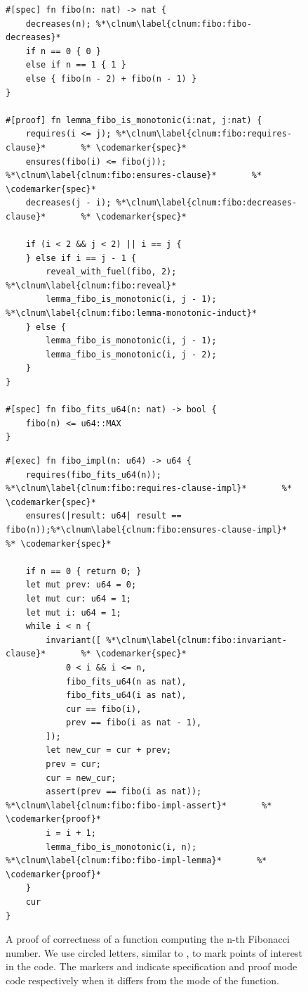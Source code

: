 \begin{figure}

\noindent\begin{minipage}{.5\textwidth}

\begin{lstlisting}[language=Verus,style=VerusLineNos]
#[spec] fn fibo(n: nat) -> nat {
    decreases(n); %*\clnum\label{clnum:fibo:fibo-decreases}*
    if n == 0 { 0 }
    else if n == 1 { 1 }
    else { fibo(n - 2) + fibo(n - 1) }
}

#[proof] fn lemma_fibo_is_monotonic(i:nat, j:nat) { 
    requires(i <= j); %*\clnum\label{clnum:fibo:requires-clause}*       %* \codemarker{spec}*
    ensures(fibo(i) <= fibo(j)); %*\clnum\label{clnum:fibo:ensures-clause}*       %* \codemarker{spec}*
    decreases(j - i); %*\clnum\label{clnum:fibo:decreases-clause}*       %* \codemarker{spec}*

    if (i < 2 && j < 2) || i == j {
    } else if i == j - 1 {
        reveal_with_fuel(fibo, 2); %*\clnum\label{clnum:fibo:reveal}*
        lemma_fibo_is_monotonic(i, j - 1); %*\clnum\label{clnum:fibo:lemma-monotonic-induct}*
    } else {
        lemma_fibo_is_monotonic(i, j - 1);
        lemma_fibo_is_monotonic(i, j - 2);
    }
}

#[spec] fn fibo_fits_u64(n: nat) -> bool {
    fibo(n) <= u64::MAX
} 
\end{lstlisting}
\end{minipage}\hfill
\noindent\begin{minipage}{.5\textwidth}

\begin{lstlisting}[language=Verus,style=VerusLineNos,firstnumber=26]
#[exec] fn fibo_impl(n: u64) -> u64 {
    requires(fibo_fits_u64(n)); %*\clnum\label{clnum:fibo:requires-clause-impl}*       %* \codemarker{spec}* 
    ensures(|result: u64| result == fibo(n));%*\clnum\label{clnum:fibo:ensures-clause-impl}*       %* \codemarker{spec}* 

    if n == 0 { return 0; } 
    let mut prev: u64 = 0;
    let mut cur: u64 = 1;
    let mut i: u64 = 1;
    while i < n {
        invariant([ %*\clnum\label{clnum:fibo:invariant-clause}*       %* \codemarker{spec}* 
            0 < i && i <= n,
            fibo_fits_u64(n as nat),
            fibo_fits_u64(i as nat),
            cur == fibo(i),
            prev == fibo(i as nat - 1),
        ]);
        let new_cur = cur + prev;
        prev = cur;
        cur = new_cur;
        assert(prev == fibo(i as nat)); %*\clnum\label{clnum:fibo:fibo-impl-assert}*       %* \codemarker{proof}*
        i = i + 1;
        lemma_fibo_is_monotonic(i, n); %*\clnum\label{clnum:fibo:fibo-impl-lemma}*       %* \codemarker{proof}*
    }
    cur
}
\end{lstlisting}
\end{minipage}
\caption{A proof of correctness of a function computing the n-th
Fibonacci number. We use circled letters, similar to \protect{},
to mark points of interest in the code. The markers \protect{} and
\protect{} indicate specification and proof mode code respectively
when it differs from the mode of the function.}
\label{listing:fibonacci}
\end{figure}

